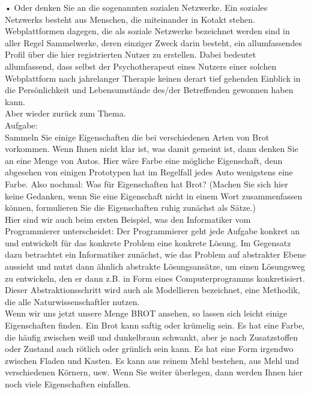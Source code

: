 •	Oder denken Sie an die sogenannten sozialen Netzwerke. Ein soziales Netzwerks besteht aus Menschen, die miteinander in Kotakt stehen. Webplattformen dagegen, die als soziale Netzwerke bezeichnet werden sind in aller Regel Sammelwerke, deren einziger Zweck darin besteht, ein allumfassendes Profil über die hier registrierten Nutzer zu erstellen. Dabei bedeutet allumfassend, dass selbst der Psychotherapeut eines Nutzers einer solchen Webplattform nach jahrelanger Therapie keinen derart tief gehenden Einblick in die Persönlichkeit und Lebensumstände des/der Betreffenden gewonnen haben kann.\\

Aber wieder zurück zum Thema.\\

Aufgabe:\\

Sammeln Sie einige Eigenschaften die bei verschiedenen Arten von Brot vorkommen. Wenn Ihnen nicht klar ist, was damit gemeint ist, dann denken Sie an eine Menge von Autos. Hier wäre Farbe eine mögliche Eigenschaft, denn abgesehen von einigen Prototypen hat im Regelfall jedes Auto wenigstens eine Farbe. Also nochmal: Was für Eigenschaften hat Brot? (Machen Sie sich hier keine Gedanken, wenn Sie eine Eigenschaft nicht in einem Wort zusammenfassen können, formulieren Sie die Eigenschaften ruhig zunächst als Sätze.)\\

Hier sind wir auch beim ersten Beispiel, was den Informatiker vom Programmierer unterscheidet: Der Programmierer geht jede Aufgabe konkret an und entwickelt für das konkrete Problem eine konkrete Lösung. Im Gegensatz dazu betrachtet ein Informatiker zunächst, wie das Problem auf abstrakter Ebene aussieht und nutzt dann ähnlich abstrakte Lösungsansätze, um einen Lösungsweg zu entwickeln, den er dann z.B. in Form eines Computerprogramms konkretisiert. Dieser Abstraktionsschritt wird auch als Modellieren bezeichnet, eine Methodik, die alle Naturwissenschaftler nutzen.\\

Wenn wir uns jetzt unsere Menge BROT ansehen, so lassen sich leicht einige Eigenschaften finden. Ein Brot kann saftig oder krümelig sein. Es hat eine Farbe, die häufig zwischen weiß und dunkelbraun schwankt, aber je nach Zusatzstoffen oder Zustand auch rötlich oder grünlich sein kann. Es hat eine Form irgendwo zwischen Fladen und Kasten. Es kann aus reinem Mehl bestehen, aus Mehl und verschiedenen Körnern, usw. Wenn Sie weiter überlegen, dann werden Ihnen hier noch viele Eigenschaften einfallen.\\

